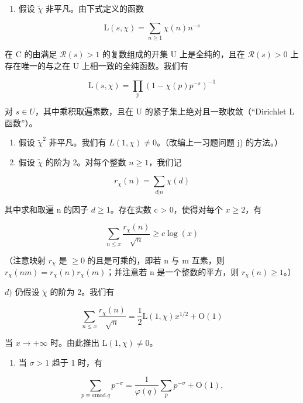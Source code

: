 \begin{enumerate}
\def\labelenumi{\alph{enumi})}
\tightlist
\item
  假设 \(\widetilde{\chi}\) 非平凡。由下式定义的函数
\end{enumerate}

\[
\mathrm{L} (s, \chi) = \sum_ {n \geqslant 1} \chi (n) n ^ {- s}
\]

在 C 的由满足 \(\mathcal{R}(s) > 1\) 的复数组成的开集 U 上是全纯的，且在 \(\mathcal{R}(s) > 0\) 上存在唯一的与之在 U 上相一致的全纯函数。我们有

\[
\mathrm{L} (s, \chi) = \prod_ {p} (1 - \chi (p) p ^ {- s}) ^ {- 1}
\]

对 \(s \in U\)，其中乘积取遍素数，且在 U 的紧子集上绝对且一致收敛（“Dirichlet L 函数”）。

\begin{enumerate}
\def\labelenumi{\alph{enumi})}
\setcounter{enumi}{1}
\item
  假设 \(\widetilde{\chi}^{2}\) 非平凡。我们有 \(L(1,\chi)\neq0\)。（改编上一习题问题 j) 的方法。）
\item
  假设 \(\widetilde{\chi}\) 的阶为 2。对每个整数 \(n \geqslant 1\)，我们记
\end{enumerate}

\[
r _ {\chi} (n) = \sum_ {d | n} \chi (d)
\]

其中求和取遍 n 的因子 \(d \geqslant 1\)。存在实数 c \textgreater{} 0，使得对每个 \(x \geqslant 2\)，有

\[
\sum_ {n \leqslant x} \frac {r _ {\chi} (n)}{\sqrt {n}} \geqslant c \log (x)
\]

（注意映射 \(r_{\chi}\) 是 \(\geqslant 0\) 的且是可乘的，即若 n 与 m 互素，则 \(r_{\chi}(nm) = r_{\chi}(n)r_{\chi}(m)\)；并注意若 n 是一个整数的平方，则 \(r_{\chi}(n) \geqslant 1\)。）

\(d)\) 仍假设 \(\widetilde{\chi}\) 的阶为 2。我们有

\[
\sum_ {n \leqslant x} \frac {r _ {\chi} (n)}{\sqrt {n}} = \frac {1}{2} \mathrm{L} (1, \chi) x ^ {1 / 2} + \mathrm{O} (1)
\]

当 \(x \to +\infty\) 时。由此推出 \(\mathrm{L}(1, \chi) \neq 0\)。

\begin{enumerate}
\def\labelenumi{\alph{enumi})}
\setcounter{enumi}{4}
\tightlist
\item
  当 \(\sigma > 1\) 趋于 1 时，有
\end{enumerate}

\[
\sum_ {p \equiv a \text {mod.} q} p ^ {- \sigma} = \frac {1}{\varphi (q)} \sum_ {p} p ^ {- \sigma} + \mathrm{O} (1),
\]


